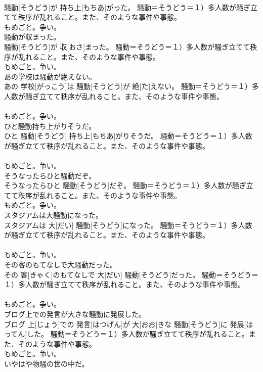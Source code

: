 \documentclass[8pt]{extreport}
\begin{document}
\begin{CJK}{UTF8}{min}
{\\	騒動[そうどう]が 持ち上[もちあ]がった。	騒動＝そうどう＝１）多人数が騒ぎ立てて秩序が乱れること。また、そのような事件や事態。 　　　　　　　　
\\	もめごと。争い。
\\	騒動が収まった。	
\\	騒動[そうどう]が 収[おさ]まった。	騒動＝そうどう＝１）多人数が騒ぎ立てて秩序が乱れること。また、そのような事件や事態。 　　　　　　　　
\\	もめごと。争い。
\\	あの学校は騒動が絶えない。	
\\	あの 学校[がっこう]は 騒動[そうどう]が 絶[た]えない。	騒動＝そうどう＝１）多人数が騒ぎ立てて秩序が乱れること。また、そのような事件や事態。 　　　　　　　　
\\	もめごと。争い。
\\	ひと騒動持ち上がりそうだ。	
\\	ひと 騒動[そうどう] 持ち上[もちあ]がりそうだ。	騒動＝そうどう＝１）多人数が騒ぎ立てて秩序が乱れること。また、そのような事件や事態。 　　　　　　　　
\\	もめごと。争い。
\\	そうなったらひと騒動だぞ。	
\\	そうなったらひと 騒動[そうどう]だぞ。	騒動＝そうどう＝１）多人数が騒ぎ立てて秩序が乱れること。また、そのような事件や事態。 　　　　　　　　
\\	もめごと。争い。
\\	スタジアムは大騒動になった。	
\\	スタジアムは 大[だい] 騒動[そうどう]になった。	騒動＝そうどう＝１）多人数が騒ぎ立てて秩序が乱れること。また、そのような事件や事態。 　　　　　　　　
\\	もめごと。争い。
\\	その客のもてなしで大騒動だった。	
\\	その 客[きゃく]のもてなしで 大[だい] 騒動[そうどう]だった。	騒動＝そうどう＝１）多人数が騒ぎ立てて秩序が乱れること。また、そのような事件や事態。 　　　　　　　　
\\	もめごと。争い。
\\	ブログ上での発言が大きな騒動に発展した。	
\\	ブログ 上[じょう]での 発言[はつげん]が 大[おお]きな 騒動[そうどう]に 発展[はってん]した。	騒動＝そうどう＝１）多人数が騒ぎ立てて秩序が乱れること。また、そのような事件や事態。 　　　　　　　　
\\	もめごと。争い。
\\	いやはや物騒の世の中だ。	
}
\end{CJK}
\end{document}
